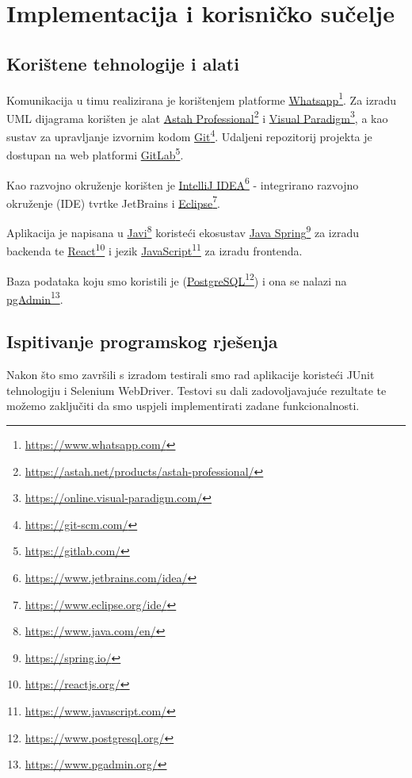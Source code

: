 \chapter{Implementacija i korisničko sučelje}
		
		
		\section{Korištene tehnologije i alati}
		
			Komunikacija u timu realizirana je korištenjem platforme \underline{Whatsapp}\footnote{\url{https://www.whatsapp.com/}}. 
			Za izradu UML dijagrama korišten je alat \underline{Astah Professional}\footnote{\url{https://astah.net/products/astah-professional/}} i \underline{Visual Paradigm}\footnote{\url{https://online.visual-paradigm.com/}}, a kao sustav za upravljanje izvornim kodom \underline{Git}\footnote{\url{https://git-scm.com/}}. 
			Udaljeni repozitorij projekta je dostupan na web platformi \underline{GitLab}\footnote{\url{https://gitlab.com/}}.
			\par
			Kao razvojno okruženje korišten je \underline{IntelliJ IDEA}\footnote{\url{https://www.jetbrains.com/idea/}} - integrirano razvojno okruženje (IDE) tvrtke JetBrains i \underline{Eclipse}\footnote{\url{https://www.eclipse.org/ide/}}. 
            \par
            Aplikacija je napisana u \underline{Javi}\footnote{\url{https://www.java.com/en/}} koristeći ekosustav \underline{Java Spring}\footnote{\url{https://spring.io/}} za
            izradu backenda te \underline{React}\footnote{\url{https://reactjs.org/}} i jezik \underline{JavaScript}\footnote{\url{https://www.javascript.com/}} za izradu frontenda. 
            \par
            Baza podataka koju smo koristili je (\underline{PostgreSQL}\footnote{\url{https://www.postgresql.org/}}) i ona se nalazi na \underline{pgAdmin}\footnote{\url{https://www.pgadmin.org/}}.

            
            \vspace*{\fill}

			
			
			\eject 
		
	
		\section{Ispitivanje programskog rješenja}
			
Nakon što smo završili s izradom testirali smo rad aplikacije koristeći JUnit tehnologiju i Selenium WebDriver. Testovi su dali zadovoljavajuće rezultate te možemo zaključiti da smo uspjeli implementirati zadane funkcionalnosti.
			
